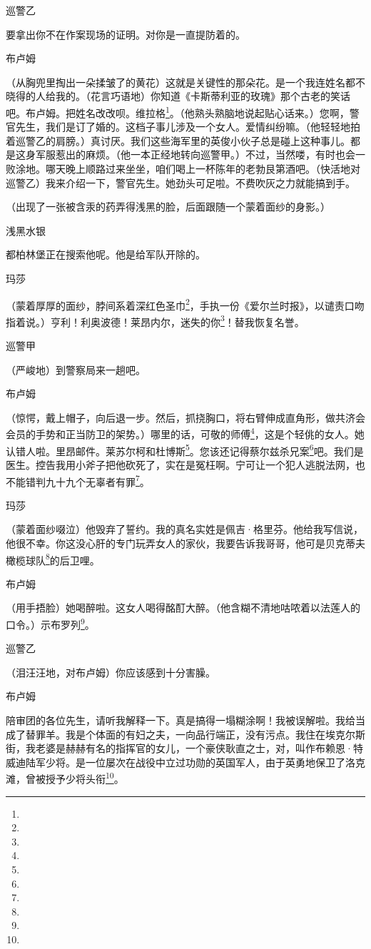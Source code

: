 \par 巡警乙
\par 要拿出你不在作案现场的证明。对你是一直提防着的。
\par 布卢姆
\par （从胸兜里掏出一朵揉皱了的黄花）这就是关键性的那朵花。是一个我连姓名都不晓得的人给我的。（花言巧语地）你知道《卡斯蒂利亚的玫瑰》那个古老的笑话吧。布卢姆。把姓名改改呗。维拉格\footnote{}。（他熟头熟脑地说起贴心话来。）您啊，警官先生，我们是订了婚的。这档子事儿涉及一个女人。爱情纠纷嘛。（他轻轻地拍着巡警乙的肩膀。）真讨厌。我们这些海军里的英俊小伙子总是碰上这种事儿。都是这身军服惹出的麻烦。（他一本正经地转向巡警甲。）不过，当然喽，有时也会一败涂地。哪天晚上顺路过来坐坐，咱们喝上一杯陈年的老勃艮第酒吧。（快活地对巡警乙）我来介绍一下，警官先生。她劲头可足啦。不费吹灰之力就能搞到手。
\par （出现了一张被含汞的药弄得浅黑的脸，后面跟随一个蒙着面纱的身影。）
\par 浅黑水银
\par 都柏林堡正在搜索他呢。他是给军队开除的。
\par 玛莎
\par （蒙着厚厚的面纱，脖间系着深红色圣巾\footnote{}，手执一份《爱尔兰时报》，以谴责口吻指着说。）亨利！利奥波德！莱昂内尔，迷失的你\footnote{}！替我恢复名誉。
\par 巡警甲
\par （严峻地）到警察局来一趟吧。
\par 布卢姆
\par （惊愕，戴上帽子，向后退一步。然后，抓挠胸口，将右臂伸成直角形，做共济会会员的手势和正当防卫的架势。）哪里的话，可敬的师傅\footnote{}，这是个轻佻的女人。她认错人啦。里昂邮件。莱苏尔柯和杜博斯\footnote{}。您该还记得蔡尔兹杀兄案\footnote{}吧。我们是医生。控告我用小斧子把他砍死了，实在是冤枉啊。宁可让一个犯人逃脱法网，也不能错判九十九个无辜者有罪\footnote{}。
\par 玛莎
\par （蒙着面纱啜泣）他毁弃了誓约。我的真名实姓是佩吉·格里芬。他给我写信说，他很不幸。你这没心肝的专门玩弄女人的家伙，我要告诉我哥哥，他可是贝克蒂夫橄榄球队\footnote{}的后卫哩。
\par 布卢姆
\par （用手捂脸）她喝醉啦。这女人喝得酩酊大醉。（他含糊不清地咕哝着以法莲人的口令。）示布罗列\footnote{}。
\par 巡警乙
\par （泪汪汪地，对布卢姆）你应该感到十分害臊。
\par 布卢姆
\par 陪审团的各位先生，请听我解释一下。真是搞得一塌糊涂啊！我被误解啦。我给当成了替罪羊。我是个体面的有妇之夫，一向品行端正，没有污点。我住在埃克尔斯街，我老婆是赫赫有名的指挥官的女儿，一个豪侠耿直之士，对，叫作布赖恩·特威迪陆军少将。是一位屡次在战役中立过功勋的英国军人，由于英勇地保卫了洛克滩，曾被授予少将头衔\footnote{}。
